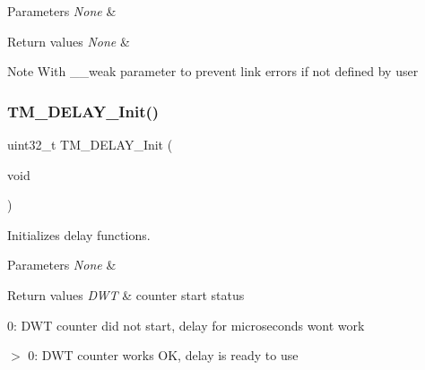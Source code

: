 \begin{DoxyParams}{Parameters}
{\em None} & \\
\hline
\end{DoxyParams}

\begin{DoxyRetVals}{Return values}
{\em None} & \\
\hline
\end{DoxyRetVals}
\begin{DoxyNote}{Note}
With \+\_\+\+\_\+weak parameter to prevent link errors if not defined by user 
\end{DoxyNote}
\mbox{\label{group___t_m___d_e_l_a_y___functions_ga4ef7d542ba00287843b9e8575be8ecbc}} 
\subsubsection{\texorpdfstring{T\+M\+\_\+\+D\+E\+L\+A\+Y\+\_\+\+Init()}{TM\_DELAY\_Init()}}
{\footnotesize\ttfamily uint32\+\_\+t T\+M\+\_\+\+D\+E\+L\+A\+Y\+\_\+\+Init (\begin{DoxyParamCaption}\item[{void}]{ }\end{DoxyParamCaption})}



Initializes delay functions. 


\begin{DoxyParams}{Parameters}
{\em None} & \\
\hline
\end{DoxyParams}

\begin{DoxyRetVals}{Return values}
{\em D\+WT} & counter start status
\begin{DoxyItemize}
\item 0\+: D\+WT counter did not start, delay for microseconds won\textquotesingle{}t work
\item $>$ 0\+: D\+WT counter works OK, delay is ready to use 
\end{DoxyItemize}\\
\hline
\end{DoxyRetVals}
